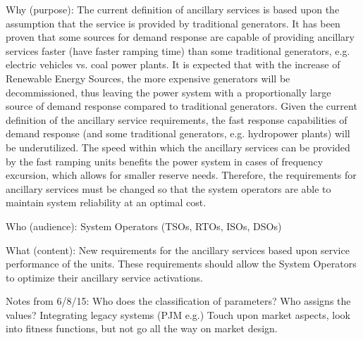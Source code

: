 Why (purpose):
The current definition of ancillary services is based upon the assumption that the service is provided by traditional generators. It has been proven that some sources for demand response are capable of providing ancillary services faster (have faster ramping time) than some traditional generators, e.g. electric vehicles vs. coal power plants. It is expected that with the increase of Renewable Energy Sources, the more expensive generators will be decommissioned, thus leaving the power system with a proportionally large source of demand response compared to traditional generators. Given the current definition of the ancillary service requirements, the fast response capabilities of demand response (and some traditional generators, e.g. hydropower plants) will be underutilized. The speed within which the ancillary services can be provided by the fast ramping units benefits the power system in cases of frequency excursion, which allows for smaller reserve needs. Therefore, the requirements for ancillary services must be changed so that the system operators are able to maintain system reliability at an optimal cost.

Who (audience): System Operators (TSOs, RTOs, ISOs, DSOs)

What (content): New requirements for the ancillary services based upon service performance of the units. These requirements should allow the System Operators to optimize their ancillary service activations.

Notes from 6/8/15:
Who does the classification of parameters? 
    Who assigns the values?
Integrating legacy systems (PJM e.g.)
Touch upon market aspects, look into fitness functions, but not go all the way on market design.